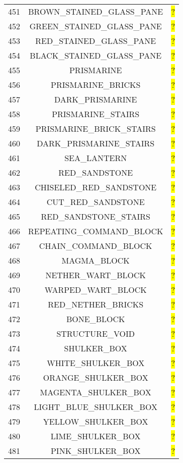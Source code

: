 \documentclass[11pt]{article}
\newcommand\myworries[1]{\sethlcolor{red}\hl{#1}}
\begin{document}
\begin{longtable}{ |c|c|c| }
451 & BROWN\_STAINED\_GLASS\_PANE & \myworries{?} \\
452 & GREEN\_STAINED\_GLASS\_PANE & \myworries{?} \\
453 & RED\_STAINED\_GLASS\_PANE & \myworries{?} \\
454 & BLACK\_STAINED\_GLASS\_PANE & \myworries{?} \\
455 & PRISMARINE & \myworries{?} \\
456 & PRISMARINE\_BRICKS & \myworries{?} \\
457 & DARK\_PRISMARINE & \myworries{?} \\
458 & PRISMARINE\_STAIRS & \myworries{?} \\
459 & PRISMARINE\_BRICK\_STAIRS & \myworries{?} \\
460 & DARK\_PRISMARINE\_STAIRS & \myworries{?} \\
461 & SEA\_LANTERN & \myworries{?} \\
462 & RED\_SANDSTONE & \myworries{?} \\
463 & CHISELED\_RED\_SANDSTONE & \myworries{?} \\
464 & CUT\_RED\_SANDSTONE & \myworries{?} \\
465 & RED\_SANDSTONE\_STAIRS & \myworries{?} \\
466 & REPEATING\_COMMAND\_BLOCK & \myworries{?} \\
467 & CHAIN\_COMMAND\_BLOCK & \myworries{?} \\
468 & MAGMA\_BLOCK & \myworries{?} \\
469 & NETHER\_WART\_BLOCK & \myworries{?} \\
470 & WARPED\_WART\_BLOCK & \myworries{?} \\
471 & RED\_NETHER\_BRICKS & \myworries{?} \\
472 & BONE\_BLOCK & \myworries{?} \\
473 & STRUCTURE\_VOID & \myworries{?} \\
474 & SHULKER\_BOX & \myworries{?} \\
475 & WHITE\_SHULKER\_BOX & \myworries{?} \\
476 & ORANGE\_SHULKER\_BOX & \myworries{?} \\
477 & MAGENTA\_SHULKER\_BOX & \myworries{?} \\
478 & LIGHT\_BLUE\_SHULKER\_BOX & \myworries{?} \\
479 & YELLOW\_SHULKER\_BOX & \myworries{?} \\
480 & LIME\_SHULKER\_BOX & \myworries{?} \\
481 & PINK\_SHULKER\_BOX & \myworries{?} \\

\end{longtable}
\end{document}
